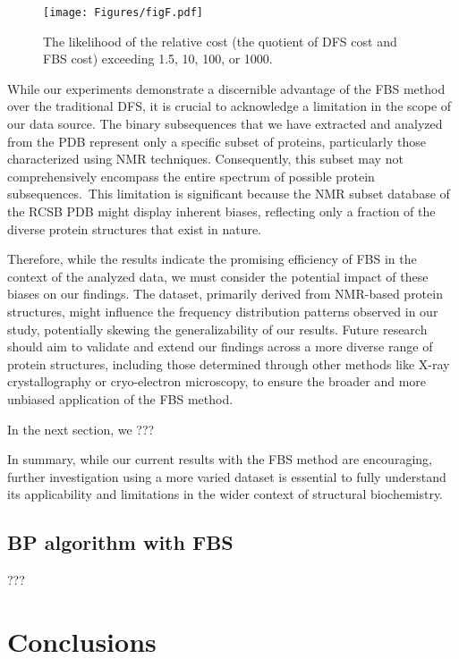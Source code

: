 \documentclass[journal=jacsat,manuscript=article]{achemso}
\begin{document}
\vspace{-8pt}\begin{figure}[H]
    \texttt{[image: Figures/figF.pdf]}
    \caption{\normalsize The likelihood of the relative cost (the quotient of DFS cost and FBS cost) exceeding 1.5, 10, 100, or 1000.}\label{subfig:prob_custo_rel_maior_q_alfa}
\end{figure}

{While our experiments demonstrate a discernible advantage of the FBS method over the traditional DFS, it is crucial to acknowledge a limitation in the scope of our data source. The binary subsequences that we have extracted and analyzed from the PDB represent only a specific subset of proteins, particularly those characterized using NMR techniques. Consequently, this subset may not comprehensively encompass the entire spectrum of possible protein subsequences.~This limitation is significant because the NMR subset database of the RCSB PDB might display inherent biases, reflecting only a fraction of the diverse protein structures that exist in nature.}

{Therefore, while the results indicate the promising efficiency of FBS in the context of the analyzed data, we must consider the potential impact of these biases on our findings. The dataset, primarily derived from NMR-based protein structures, might influence the frequency distribution patterns observed in our study, potentially skewing the generalizability of our results. Future research should aim to validate and extend our findings across a more diverse range of protein structures, including those determined through other methods like X-ray crystallography or cryo-electron microscopy, to ensure the broader and more unbiased application of the FBS method.}

{\color{red} In the next section, we ???}

{In summary, while our current results with the FBS method are encouraging, further investigation using a more varied dataset is essential to fully understand its applicability and limitations in the wider context of structural biochemistry.}

{\color{red}\subsection{BP algorithm with FBS}

???}

\section{Conclusions}
\end{document}
